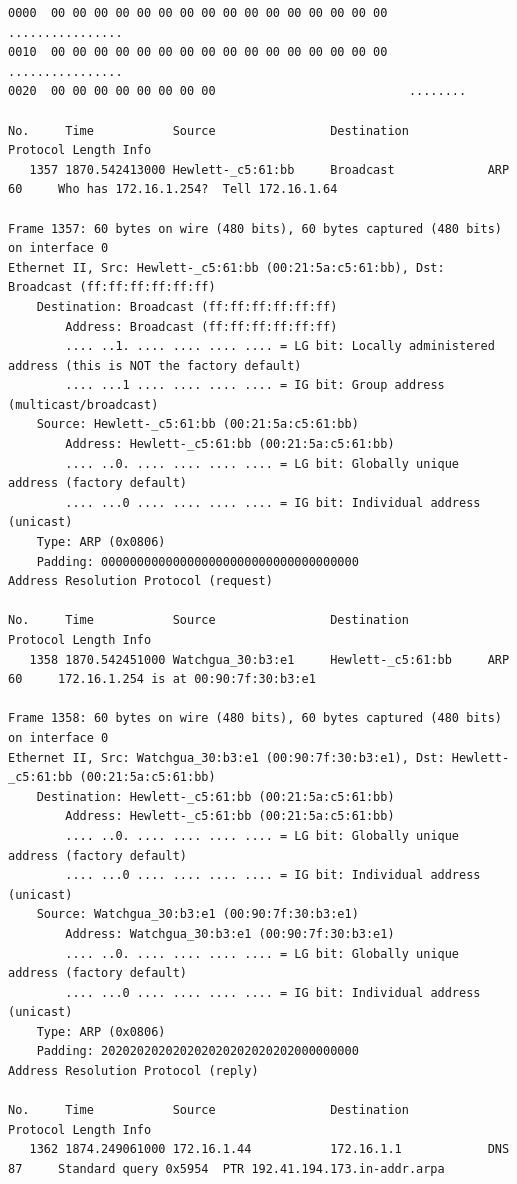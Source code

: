 \documentclass[a4paper,11pt]{article}
\begin{document}
\begin{lstlisting}
0000  00 00 00 00 00 00 00 00 00 00 00 00 00 00 00 00   ................
0010  00 00 00 00 00 00 00 00 00 00 00 00 00 00 00 00   ................
0020  00 00 00 00 00 00 00 00                           ........

No.     Time           Source                Destination           Protocol Length Info
   1357 1870.542413000 Hewlett-_c5:61:bb     Broadcast             ARP      60     Who has 172.16.1.254?  Tell 172.16.1.64

Frame 1357: 60 bytes on wire (480 bits), 60 bytes captured (480 bits) on interface 0
Ethernet II, Src: Hewlett-_c5:61:bb (00:21:5a:c5:61:bb), Dst: Broadcast (ff:ff:ff:ff:ff:ff)
    Destination: Broadcast (ff:ff:ff:ff:ff:ff)
        Address: Broadcast (ff:ff:ff:ff:ff:ff)
        .... ..1. .... .... .... .... = LG bit: Locally administered address (this is NOT the factory default)
        .... ...1 .... .... .... .... = IG bit: Group address (multicast/broadcast)
    Source: Hewlett-_c5:61:bb (00:21:5a:c5:61:bb)
        Address: Hewlett-_c5:61:bb (00:21:5a:c5:61:bb)
        .... ..0. .... .... .... .... = LG bit: Globally unique address (factory default)
        .... ...0 .... .... .... .... = IG bit: Individual address (unicast)
    Type: ARP (0x0806)
    Padding: 000000000000000000000000000000000000
Address Resolution Protocol (request)

No.     Time           Source                Destination           Protocol Length Info
   1358 1870.542451000 Watchgua_30:b3:e1     Hewlett-_c5:61:bb     ARP      60     172.16.1.254 is at 00:90:7f:30:b3:e1

Frame 1358: 60 bytes on wire (480 bits), 60 bytes captured (480 bits) on interface 0
Ethernet II, Src: Watchgua_30:b3:e1 (00:90:7f:30:b3:e1), Dst: Hewlett-_c5:61:bb (00:21:5a:c5:61:bb)
    Destination: Hewlett-_c5:61:bb (00:21:5a:c5:61:bb)
        Address: Hewlett-_c5:61:bb (00:21:5a:c5:61:bb)
        .... ..0. .... .... .... .... = LG bit: Globally unique address (factory default)
        .... ...0 .... .... .... .... = IG bit: Individual address (unicast)
    Source: Watchgua_30:b3:e1 (00:90:7f:30:b3:e1)
        Address: Watchgua_30:b3:e1 (00:90:7f:30:b3:e1)
        .... ..0. .... .... .... .... = LG bit: Globally unique address (factory default)
        .... ...0 .... .... .... .... = IG bit: Individual address (unicast)
    Type: ARP (0x0806)
    Padding: 202020202020202020202020202000000000
Address Resolution Protocol (reply)

No.     Time           Source                Destination           Protocol Length Info
   1362 1874.249061000 172.16.1.44           172.16.1.1            DNS      87     Standard query 0x5954  PTR 192.41.194.173.in-addr.arpa


\end{lstlisting}
\end{document}
